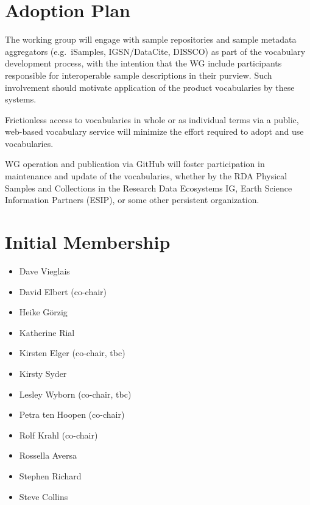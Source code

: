 \documentclass{scrartcl}
\begin{document}
\section{Adoption Plan}

The working group will engage with sample repositories and sample
metadata aggregators (e.g.\ iSamples, IGSN/DataCite, DISSCO) as part
of the vocabulary development process, with the intention that the WG
include participants responsible for interoperable sample descriptions
in their purview.  Such involvement should motivate application of the
product vocabularies by these systems.

Frictionless access to vocabularies in whole or as individual terms
via a public, web-based vocabulary service will minimize the effort
required to adopt and use vocabularies.

WG operation and publication via GitHub will foster participation in
maintenance and update of the vocabularies, whether by the RDA
Physical Samples and Collections in the Research Data Ecosystems IG,
Earth Science Information Partners (ESIP), or some other persistent
organization.

\section{Initial Membership}

\begin{itemize}
\item Dave Vieglais
\item David Elbert (co-chair)
\item Heike Görzig
\item Katherine Rial
\item Kirsten Elger (co-chair, tbc)
\item Kirsty Syder
\item Lesley Wyborn (co-chair, tbc)
\item Petra ten Hoopen (co-chair)
\item Rolf Krahl (co-chair)
\item Rossella Aversa
\item Stephen Richard
\item Steve Collins
\end{itemize}
\end{document}
